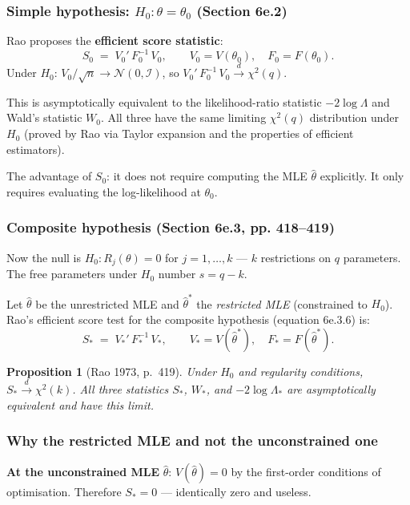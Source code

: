 \documentclass[a4paper,oneside,12pt]{extarticle}
\theoremstyle{plain}
\newtheorem{proposition}{Proposition}
\theoremstyle{definition}
\theoremstyle{remark}
\begin{document}
\subsubsection*{Simple hypothesis: $H_0:\theta = \theta_0$ (Section 6e.2)}

Rao proposes the \textbf{efficient score statistic}:
\[
  S_0 \;=\; V_0'\,F_0^{-1}\,V_0,
  \qquad V_0 = V(\theta_0),\quad F_0 = F(\theta_0).
\]
Under $H_0$: $V_0/\sqrt{n} \to \mathcal{N}(0,\mathcal{I})$, so
$V_0'\,F_0^{-1}\,V_0 \xrightarrow{d} \chi^2(q)$.

This is asymptotically equivalent to the likelihood-ratio statistic
$-2\log\Lambda$ and Wald's statistic $W_0$.  All three have the same
limiting $\chi^2(q)$ distribution under $H_0$ (proved by Rao via
Taylor expansion and the properties of efficient estimators).

The advantage of $S_0$: it does not require computing the MLE
$\hat\theta$ explicitly.  It only requires evaluating the
log-likelihood at $\theta_0$.

\subsubsection*{Composite hypothesis (Section 6e.3, pp. 418--419)}

Now the null is $H_0: R_j(\theta) = 0$ for $j = 1,\ldots,k$ ---
$k$ restrictions on $q$ parameters.  The free parameters under $H_0$
number $s = q - k$.

Let $\hat\theta$ be the unrestricted MLE and $\hat\theta^*$ the
\emph{restricted MLE} (constrained to $H_0$).  Rao's efficient score
test for the composite hypothesis (equation 6e.3.6) is:
\[
  S_* \;=\; V_*'\,F_*^{-1}\,V_*,
  \qquad V_* = V(\hat\theta^*),\quad F_* = F(\hat\theta^*).
\]

\begin{proposition}[Rao 1973, p.~419]
Under $H_0$ and regularity conditions, $S_* \xrightarrow{d} \chi^2(k)$.
All three statistics $S_*$, $W_*$, and $-2\log\Lambda_*$ are
asymptotically equivalent and have this limit.
\end{proposition}

\subsubsection*{Why the restricted MLE and not the unconstrained one}

\textbf{At the unconstrained MLE} $\hat\theta$: $V(\hat\theta) = 0$
by the first-order conditions of optimisation.  Therefore
$S_* = 0$ — identically zero and useless.
\end{document}
